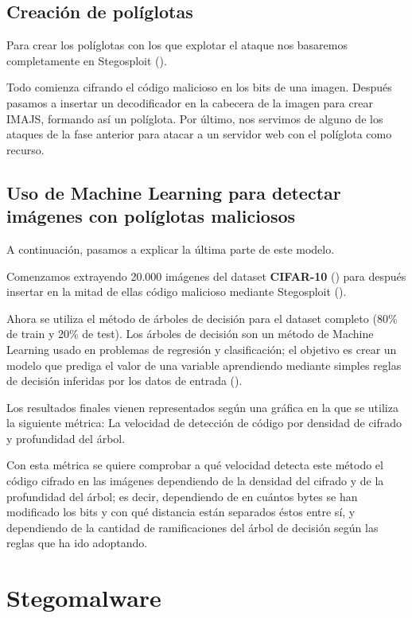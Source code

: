 \subsection{Creación de políglotas}

Para crear los políglotas con los que explotar el ataque nos basaremos completamente en Stegosploit (\cite{stegosploit}).

Todo comienza cifrando el código malicioso en los bits de una imagen. Después pasamos a insertar un decodificador en la cabecera de la imagen para crear IMAJS, formando así un políglota. Por último, nos servimos de alguno de los ataques de la fase anterior para atacar a un servidor web con el políglota como recurso.

\subsection{Uso de Machine Learning para detectar imágenes con políglotas maliciosos}

A continuación, pasamos a explicar la última parte de este modelo.

Comenzamos extrayendo 20.000 imágenes del dataset \textbf{CIFAR-10} (\cite{cifar10}) para después insertar en la mitad de ellas código malicioso mediante Stegosploit (\cite{stegosploit}). %

Ahora se utiliza el método de árboles de decisión para el dataset completo (80\% de train y 20\% de test). Los árboles de decisión son un método de Machine Learning usado en problemas de regresión y clasificación; el objetivo es crear un modelo que prediga el valor de una variable aprendiendo mediante simples reglas de decisión inferidas por los datos de entrada (\cite{decision-trees}). %

Los resultados finales vienen representados según una gráfica en la que se utiliza la siguiente métrica: La velocidad de detección de código por densidad de cifrado y profundidad del árbol.

Con esta métrica se quiere comprobar a qué velocidad detecta este método el código cifrado en las imágenes dependiendo de la densidad del cifrado y de la profundidad del árbol; es decir, dependiendo de en cuántos bytes se han modificado los bits y con qué distancia están separados éstos entre sí, y dependiendo de la cantidad de ramificaciones del árbol de decisión según las reglas que ha ido adoptando.

\section{Stegomalware}

